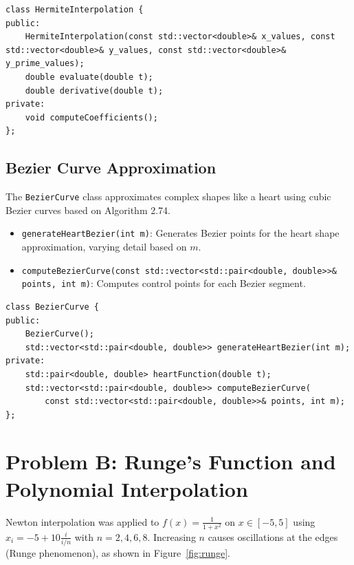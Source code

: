 \documentclass[a4paper]{article}
\begin{document}
\begin{lstlisting}
class HermiteInterpolation {
public:
    HermiteInterpolation(const std::vector<double>& x_values, const std::vector<double>& y_values, const std::vector<double>& y_prime_values);
    double evaluate(double t);
    double derivative(double t);
private:
    void computeCoefficients();
};
\end{lstlisting}

\subsection*{Bezier Curve Approximation}
The \texttt{BezierCurve} class approximates complex shapes like a heart using cubic Bezier curves based on Algorithm 2.74.
\begin{itemize}
    \item \texttt{generateHeartBezier(int m)}: Generates Bezier points for the heart shape approximation, varying detail based on \( m \).
    \item \texttt{computeBezierCurve(const std::vector<std::pair<double, double>>\& points, int m)}: Computes control points for each Bezier segment.
\end{itemize}

\begin{lstlisting}
class BezierCurve {
public:
    BezierCurve();
    std::vector<std::pair<double, double>> generateHeartBezier(int m);
private:
    std::pair<double, double> heartFunction(double t);
    std::vector<std::pair<double, double>> computeBezierCurve(
        const std::vector<std::pair<double, double>>& points, int m);
};
\end{lstlisting}

\section*{Problem B: Runge's Function and Polynomial Interpolation}
Newton interpolation was applied to \( f(x) = \frac{1}{1 + x^2} \) on \( x \in [-5, 5] \) using \( x_i = -5 + 10 \frac{i}{i/n} \) with \( n = 2, 4, 6, 8 \). Increasing \( n \) causes oscillations at the edges (Runge phenomenon), as shown in Figure~\ref{fig:runge}.
\end{document}
